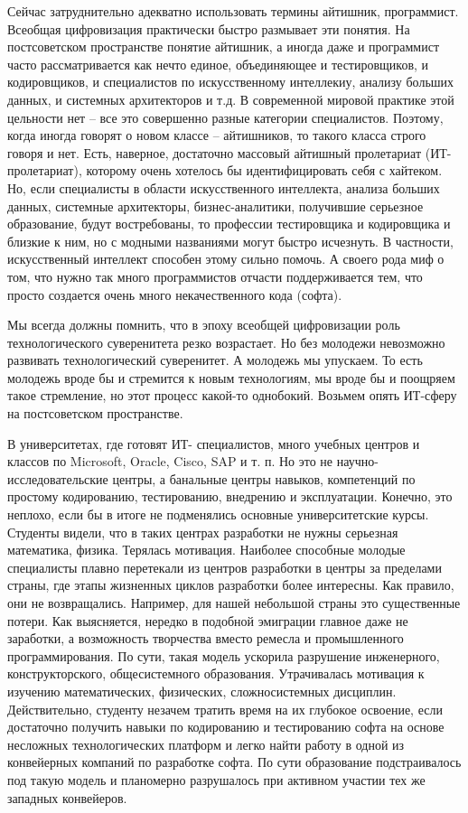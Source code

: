 \begin{partbacktext}
Сейчас затруднительно адекватно использовать термины айтишник, программист. Всеобщая цифровизация практически быстро размывает эти понятия. На постсоветском пространстве понятие айтишник, а иногда даже и программист часто рассматривается как нечто единое, объединяющее и тестировщиков, и кодировщиков, и специалистов по искусственному интеллекиу, анализу больших данных, и системных архитекторов и т.д. В современной мировой практике  этой цельности нет – все это совершенно разные категории специалистов. Поэтому, когда иногда говорят о новом классе – айтишников, то такого класса строго говоря и нет. Есть, наверное, достаточно массовый айтишный пролетариат (ИТ-пролетариат), которому очень хотелось бы идентифицировать себя с хайтеком. Но, если специалисты в области искусственного интеллекта, анализа больших данных, системные архитекторы, бизнес-аналитики, получившие серьезное образование, будут востребованы, то профессии тестировщика и кодировщика и близкие к ним, но с модными названиями могут быстро исчезнуть. В частности, искусственный интеллект способен этому сильно помочь. А своего рода миф о том, что нужно так много программистов отчасти поддерживается тем, что просто создается очень много некачественного кода (софта).

Мы всегда должны помнить, что в эпоху всеобщей цифровизации роль технологического суверенитета резко возрастает. Но без молодежи невозможно развивать технологический суверенитет. А молодежь мы упускаем. То есть молодежь вроде бы и стремится к новым технологиям, мы вроде бы и поощряем такое стремление, но этот процесс какой-то однобокий. Возьмем опять ИТ-сферу на постсоветском пространстве.
 
В университетах, где готовят ИТ- специалистов, много учебных центров и классов по Microsoft, Oracle, Cisco, SAP и т. п. Но это не научно-исследовательские центры, а банальные центры навыков, компетенций по простому кодированию, тестированию, внедрению и эксплуатации. Конечно, это неплохо, если бы в итоге не подменялись основные университетские курсы. Студенты видели, что в таких центрах разработки не нужны серьезная математика, физика. Терялась мотивация. Наиболее способные молодые специалисты плавно перетекали из центров разработки в центры за пределами страны, где этапы жизненных циклов разработки более интересны. Как правило, они не возвращались. Например, для нашей небольшой страны это существенные потери. Как выясняется, нередко в подобной эмиграции главное даже не заработки, а возможность творчества вместо ремесла и промышленного программирования. По сути, такая модель ускорила разрушение инженерного, конструкторского, общесистемного образования. Утрачивалась мотивация к изучению математических, физических, сложносистемных дисциплин. Действительно, студенту незачем тратить время на их глубокое освоение, если достаточно получить навыки по кодированию и тестированию софта на основе несложных технологических платформ и легко найти работу в одной из конвейерных компаний по разработке софта. По сути образование подстраивалось под такую модель и планомерно разрушалось при активном участии тех же западных конвейеров. 


\end{partbacktext}

